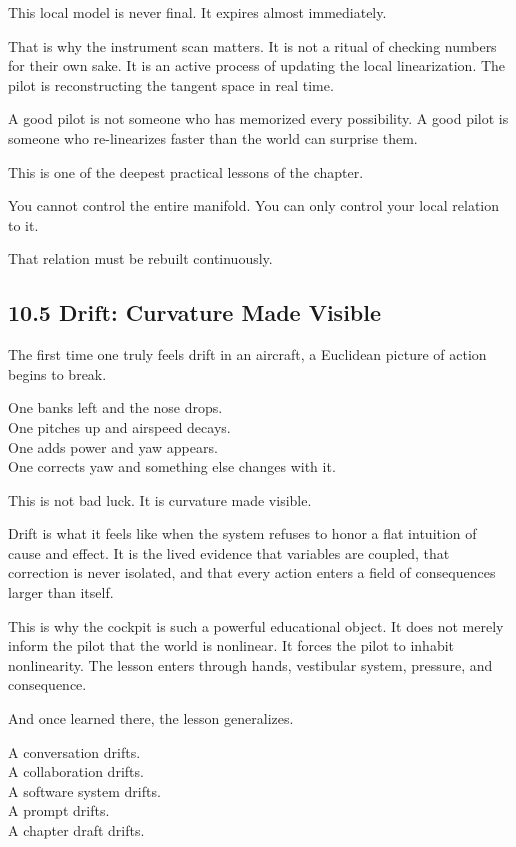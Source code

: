 \documentclass[
]{article}
\begin{document}
This local model is never final. It expires almost immediately.

That is why the instrument scan matters. It is not a ritual of checking
numbers for their own sake. It is an active process of updating the
local linearization. The pilot is reconstructing the tangent space in
real time.

A good pilot is not someone who has memorized every possibility. A good
pilot is someone who re-linearizes faster than the world can surprise
them.

This is one of the deepest practical lessons of the chapter.

You cannot control the entire manifold. You can only control your local
relation to it.

That relation must be rebuilt continuously.

\hypertarget{drift-curvature-made-visible}{%
\subsection{10.5 Drift: Curvature Made
Visible}\label{drift-curvature-made-visible}}

The first time one truly feels drift in an aircraft, a Euclidean picture
of action begins to break.

One banks left and the nose drops.\\
One pitches up and airspeed decays.\\
One adds power and yaw appears.\\
One corrects yaw and something else changes with it.

This is not bad luck. It is curvature made visible.

Drift is what it feels like when the system refuses to honor a flat
intuition of cause and effect. It is the lived evidence that variables
are coupled, that correction is never isolated, and that every action
enters a field of consequences larger than itself.

This is why the cockpit is such a powerful educational object. It does
not merely inform the pilot that the world is nonlinear. It forces the
pilot to inhabit nonlinearity. The lesson enters through hands,
vestibular system, pressure, and consequence.

And once learned there, the lesson generalizes.

A conversation drifts.\\
A collaboration drifts.\\
A software system drifts.\\
A prompt drifts.\\
A chapter draft drifts.
\end{document}
